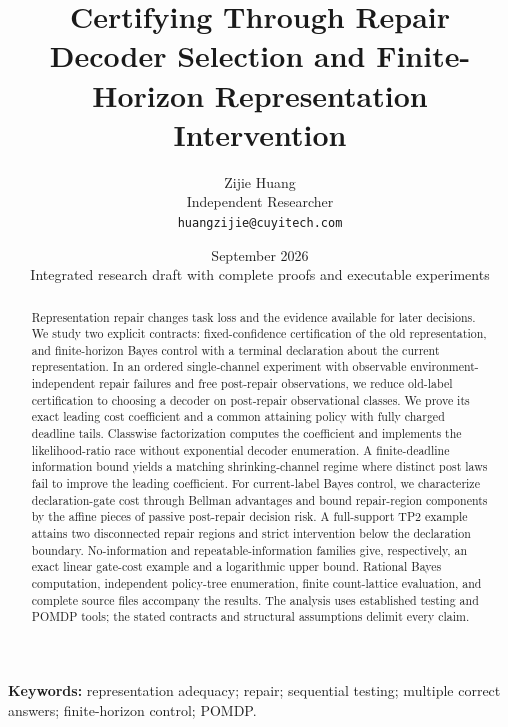 \documentclass[11pt]{article}
\title{\textbf{Certifying Through Repair}\\[5pt]
\large Decoder Selection and Finite-Horizon Representation Intervention}
\author{Zijie Huang\\Independent Researcher\\\texttt{huangzijie@cuyitech.com}}
\date{September 2026\\[3pt]\small Integrated research draft with complete proofs and executable experiments}
\theoremstyle{definition}
\theoremstyle{remark}\newtheorem{remark}[theorem]{Remark}
\begin{document}
\maketitle
\begin{abstract}
Representation repair changes task loss and the evidence available for later
decisions. We study two explicit contracts: fixed-confidence certification of
the old representation, and finite-horizon Bayes control with a terminal
declaration about the current representation. In an ordered single-channel
experiment with observable environment-independent repair failures and free
post-repair observations, we reduce old-label certification to choosing a
decoder on post-repair observational classes. We prove its exact leading
cost coefficient and a common attaining policy with fully charged deadline
tails. Classwise factorization computes the coefficient and implements the
likelihood-ratio race without exponential decoder enumeration. A finite-deadline
information bound yields a matching shrinking-channel regime where distinct
post laws fail to improve the leading coefficient. For current-label Bayes
control, we characterize declaration-gate cost through Bellman advantages
and bound repair-region components by the affine pieces of passive
post-repair decision risk. A full-support TP2 example attains two disconnected
repair regions and strict intervention below the declaration boundary.
No-information and repeatable-information families give, respectively,
an exact linear gate-cost example and a logarithmic upper bound.
Rational Bayes computation, independent policy-tree enumeration, finite
count-lattice evaluation, and complete source files accompany the results.
The analysis uses established testing and POMDP tools; the stated contracts
and structural assumptions delimit every claim.
\end{abstract}
\noindent\textbf{Keywords:} representation adequacy; repair; sequential testing;
multiple correct answers; finite-horizon control; POMDP.
\clearpage
{\small\tableofcontents}
\clearpage










\FloatBarrier



\clearpage
\appendix


\end{document}
